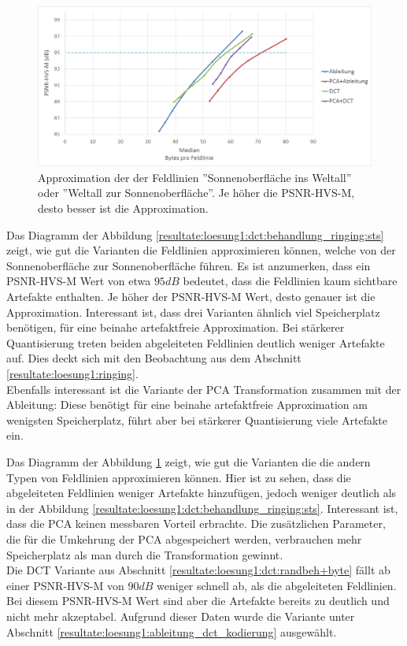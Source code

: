 \begin{figure}[!htbp]
	\center
\includegraphics[width=1\textwidth,keepaspectratio]{./pictures/resultate/loesung1/ringing/nosts.png}
	\caption{Approximation der der Feldlinien ''Sonnenoberfläche ins Weltall'' oder ''Weltall zur Sonnenoberfläche''. Je höher die PSNR-HVS-M, desto besser ist die Approximation.}	\label{resultate:loesung1:dct:behandlung_ringing:nosts}
\end{figure}
Das Diagramm der Abbildung \ref{resultate:loesung1:dct:behandlung_ringing:sts} zeigt, wie gut die Varianten die Feldlinien approximieren können, welche von der Sonnenoberfläche zur Sonnenoberfläche führen. Es ist anzumerken, dass ein PSNR-HVS-M Wert von etwa $95 dB$ bedeutet, dass die Feldlinien kaum sichtbare Artefakte enthalten. Je höher der PSNR-HVS-M Wert, desto genauer ist die Approximation. Interessant ist, dass drei Varianten ähnlich viel Speicherplatz benötigen, für eine beinahe artefaktfreie Approximation. Bei stärkerer Quantisierung treten beiden abgeleiteten Feldlinien deutlich weniger Artefakte auf. Dies deckt sich mit den Beobachtung aus dem Abschnitt \ref{resultate:loesung1:ringing}.\\
Ebenfalls interessant ist die Variante der PCA Transformation zusammen mit der Ableitung: Diese benötigt für eine beinahe artefaktfreie Approximation am wenigsten Speicherplatz, führt aber bei stärkerer Quantisierung viele Artefakte ein.

Das Diagramm der Abbildung  \ref{resultate:loesung1:dct:behandlung_ringing:nosts} zeigt, wie gut die Varianten die die andern Typen von Feldlinien approximieren können. Hier ist zu sehen, dass die abgeleiteten Feldlinien weniger Artefakte hinzufügen, jedoch weniger deutlich als in der Abbildung \ref{resultate:loesung1:dct:behandlung_ringing:sts}. Interessant ist, dass die PCA keinen messbaren Vorteil erbrachte. Die zusätzlichen Parameter, die für die Umkehrung der PCA abgespeichert werden, verbrauchen mehr Speicherplatz als man durch die Transformation gewinnt.\\
Die DCT Variante aus Abschnitt \ref{resultate:loesung1:dct:randbeh+byte} fällt ab einer PSNR-HVS-M von $90 dB$ weniger schnell ab, als die abgeleiteten Feldlinien. Bei diesem PSNR-HVS-M Wert sind aber die Artefakte bereits zu deutlich und nicht mehr akzeptabel. Aufgrund dieser Daten wurde die Variante unter Abschnitt \ref{resultate:loesung1:ableitung_dct_kodierung} ausgewählt. 

